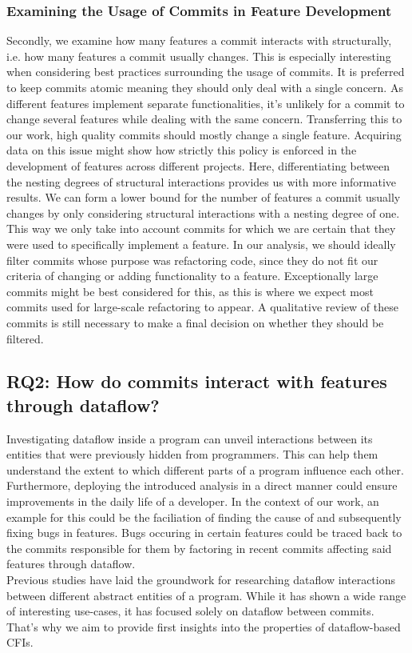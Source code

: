 \subsubsection*{Examining the Usage of Commits in Feature Development}

Secondly, we examine how many features a commit interacts with structurally, i.e. how many features a commit usually changes. 
This is especially interesting when considering best practices surrounding the usage of commits.
It is preferred to keep commits atomic\cite{hundhausen2021commit_metrics} meaning they should only deal with a single concern.
As different features implement separate functionalities, it's unlikely for a commit to change several features while dealing with the same concern.
Transferring this to our work, high quality commits should mostly change a single feature.
Acquiring data on this issue might show how strictly this policy is enforced in the development of features across different projects. 
Here, differentiating between the nesting degrees of structural interactions provides us with more informative results. 
We can form a lower bound for the number of features a commit usually changes by only considering structural interactions with a nesting degree of one.
This way we only take into account commits for which we are certain that they were used to specifically implement a feature.
In our analysis, we should ideally filter commits whose purpose was refactoring code, since they do not fit our criteria of changing or adding functionality to a feature.
Exceptionally large commits might be best considered for this, as this is where we expect most commits used for large-scale refactoring to appear.
A qualitative review of these commits is still necessary to make a final decision on whether they should be filtered.

\subsection*{\textbf{RQ2: How do commits interact with features through dataflow?}}

Investigating dataflow inside a program can unveil interactions between its entities that were previously hidden from programmers.
This can help them understand the extent to which different parts of a program influence each other.
Furthermore, deploying the introduced analysis in a direct manner could ensure improvements in the daily life of a developer.
In the context of our work, an example for this could be the faciliation of finding the cause of and subsequently fixing bugs in features.
Bugs occuring in certain features could be traced back to the commits responsible for them by factoring in recent commits affecting said features through dataflow. \\
Previous studies have laid the groundwork for researching dataflow interactions between different abstract entities of a program.
While it has shown a wide range of interesting use-cases, it has focused solely on dataflow between commits.
That's why we aim to provide first insights into the properties of dataflow-based CFIs.

